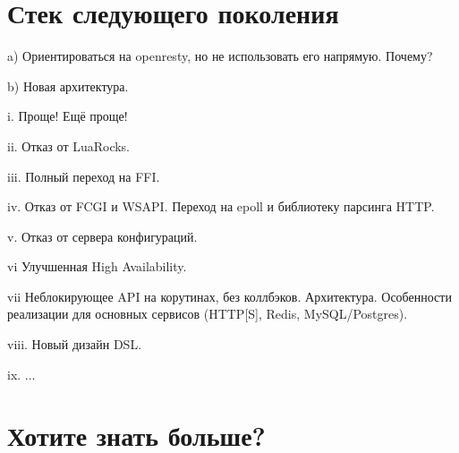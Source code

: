 \documentclass[aspectratio=169,handout,bigger]{beamer}
\begin{document}
\section{Стек следующего поколения}

\begin{frame}
a) Ориентироваться на openresty, но не использовать его напрямую. Почему?
\end{frame}

\begin{frame}
b) Новая архитектура.
\end{frame}

\begin{frame}
i. Проще! Ещё проще!
\end{frame}

\begin{frame}
ii. Отказ от LuaRocks.
\end{frame}

\begin{frame}
iii. Полный переход на FFI.
\end{frame}

\begin{frame}
iv. Отказ от FCGI и WSAPI. Переход на epoll и библиотеку парсинга HTTP.
\end{frame}

\begin{frame}
v. Отказ от сервера конфигураций.
\end{frame}

\begin{frame}
vi Улучшенная High Availability.
\end{frame}

\begin{frame}
vii Неблокирующее API на корутинах, без коллбэков. Архитектура. Особенности реализации для основных сервисов (HTTP[S], Redis, MySQL/Postgres).
\end{frame}

\begin{frame}
viii. Новый дизайн DSL.
\end{frame}

\begin{frame}
ix. ...
\end{frame}


\section{Хотите знать больше?}
\end{document}
